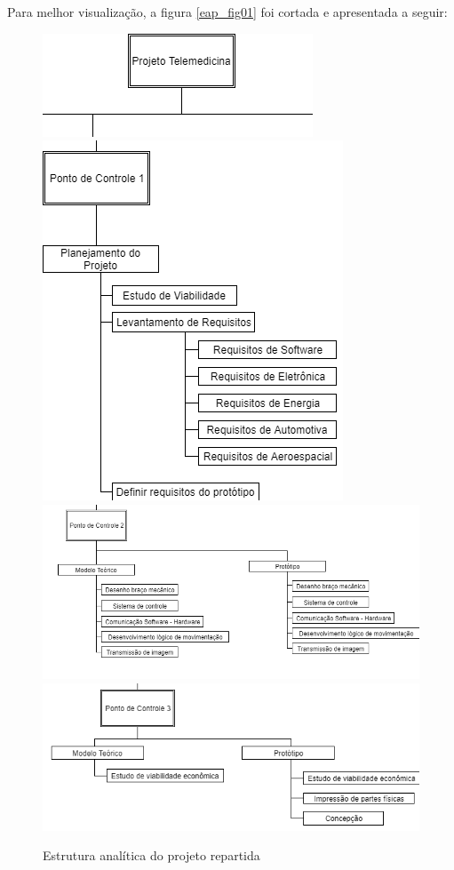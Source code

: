 Para melhor visualização, a figura \ref{eap_fig01} foi cortada e apresentada a seguir:

\begin{figure}[h]
\centering
\begin{minipage}[c]{\textwidth}
\centering
  		\includegraphics[scale=0.5]{figuras/eap_cort1.png} \\
  		\includegraphics[scale=0.5]{figuras/eap_cort2.png} \\
  		\includegraphics[scale=0.5]{figuras/eap_cort3.png} \\
 	    \includegraphics[scale=0.5]{figuras/eap_cort4.png}
    	\caption{Estrutura analítica do projeto repartida}
    	\label{fig:sample_figure}
\end{minipage}
\end{figure}


